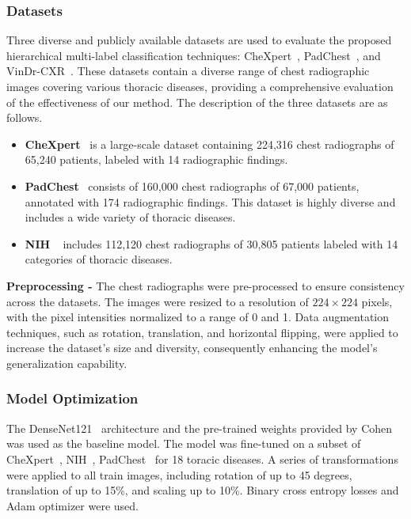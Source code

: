 \subsubsection{Datasets}
Three diverse and publicly available datasets are used  to evaluate the proposed hierarchical multi-label classification techniques: CheXpert~\cite{irvin_CheXpert_2019}, PadChest~\cite{bustos_Padchest_2020}, and VinDr-CXR~\cite{nguyen_VinDrCXR_2022}. These datasets contain a diverse range of chest radiographic images covering various thoracic diseases, providing a comprehensive evaluation of the effectiveness of our method. The description of the three datasets are as follows.
\begin{itemize}
    \item  \textbf{CheXpert}~\cite{irvin_CheXpert_2019} is a large-scale dataset containing 224,316 chest radiographs of 65,240 patients, labeled with 14 radiographic findings.
    \item \textbf{PadChest}~\cite{bustos_Padchest_2020} consists of 160,000 chest radiographs of 67,000 patients, annotated with 174 radiographic findings. This dataset is highly diverse and includes a wide variety of thoracic diseases.
    \item \textbf{NIH }~\cite{wang_ChestXRay8_2017} includes 112,120 chest radiographs of 30,805 patients labeled with 14 categories of thoracic diseases.
\end{itemize}

\textbf{Preprocessing - } The chest radiographs were pre-processed to ensure consistency across the datasets. The images were resized to a resolution of $224 \times 224$ pixels, with the pixel intensities normalized to a range of 0 and 1. Data augmentation techniques, such as rotation, translation, and horizontal flipping, were applied to increase the dataset's size and diversity, consequently enhancing the model's generalization capability.

\subsubsection{Model Optimization}
The DenseNet121~\cite{huang_Densely_2017} architecture and the pre-trained weights provided by Cohen~\cite{cohen_TorchXRayVision_2022} was used as the baseline model. The model was fine-tuned on a subset of CheXpert~\cite{irvin_CheXpert_2019}, NIH~\cite{wang_ChestXRay8_2017}, PadChest~\cite{bustos_Padchest_2020} for 18 toracic diseases. A series of transformations were applied to all train images, including rotation of up to 45 degrees, translation of up to 15\%, and scaling up to 10\%. Binary cross entropy losses and Adam optimizer were used.

